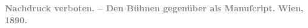 \begin{ledgroupsized}[t]{13cm}
           {\bigskip}\pstart
           \noindent{}\centering{}\textcolor{gray}{\textbf{Nachdruck verboten. – Den Bühnen gegenüber als Manuſcript.}}\pend
           \pstart
           \noindent{}\centering{}\textcolor{gray}{\textbf{Wien, 1890.}}\pend
           \endnumbering{}\end{ledgroupsized}  \newcommand{\dateiname}{L00011}\newcommand{\titel}{Arthur Schnitzler: Widmungsexemplar Alkandi’s Lied für Hugo von Hofmannsthal, [5.? 5. 1891]}\newcommand{\editorInnen}{Martin Anton Müller und Gerd-Hermann Susen}
            \footnotesize
\begin{ledgroupsized}[t]{11.5cm}
\end{ledgroupsized}
         
      